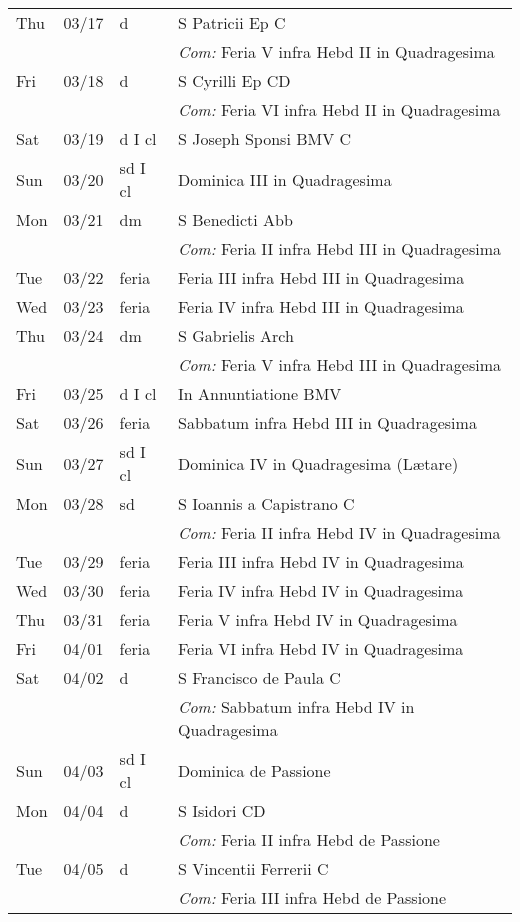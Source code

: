 \documentclass[10pt]{article}
\begin{document}
\begin{longtable}{ l l l l }
Thu & 03/17 & d & S Patricii Ep C\\
 & & & \textit{Com:} Feria V infra Hebd II in Quadragesima\\
Fri & 03/18 & d & S Cyrilli Ep CD\\
 & & & \textit{Com:} Feria VI infra Hebd II in Quadragesima\\
Sat & 03/19 & d I cl & S Joseph Sponsi BMV C\\
Sun & 03/20 & sd I cl & Dominica III in Quadragesima\\
Mon & 03/21 & dm & S Benedicti Abb\\
 & & & \textit{Com:} Feria II infra Hebd III in Quadragesima\\
Tue & 03/22 & feria & Feria III infra Hebd III in Quadragesima\\
Wed & 03/23 & feria & Feria IV infra Hebd III in Quadragesima\\
Thu & 03/24 & dm & S Gabrielis Arch\\
 & & & \textit{Com:} Feria V infra Hebd III in Quadragesima\\
Fri & 03/25 & d I cl & In Annuntiatione BMV\\
Sat & 03/26 & feria & Sabbatum infra Hebd III in Quadragesima\\
Sun & 03/27 & sd I cl & Dominica IV in Quadragesima (Lætare)\\
Mon & 03/28 & sd & S Ioannis a Capistrano C\\
 & & & \textit{Com:} Feria II infra Hebd IV in Quadragesima \\
Tue & 03/29 & feria & Feria III infra Hebd IV in Quadragesima \\
Wed & 03/30 & feria & Feria IV infra Hebd IV in Quadragesima \\
Thu & 03/31 & feria & Feria V infra Hebd IV in Quadragesima \\
Fri & 04/01 & feria & Feria VI infra Hebd IV in Quadragesima \\
Sat & 04/02 & d & S Francisco de Paula C\\
 & & & \textit{Com:} Sabbatum infra Hebd IV in Quadragesima \\
Sun & 04/03 & sd I cl & Dominica de Passione\\
Mon & 04/04 & d & S Isidori CD\\
 & & & \textit{Com:} Feria II infra Hebd de Passione\\
Tue & 04/05 & d & S Vincentii Ferrerii C\\
 & & & \textit{Com:} Feria III infra Hebd de Passione\\

\end{longtable}
\end{document}

